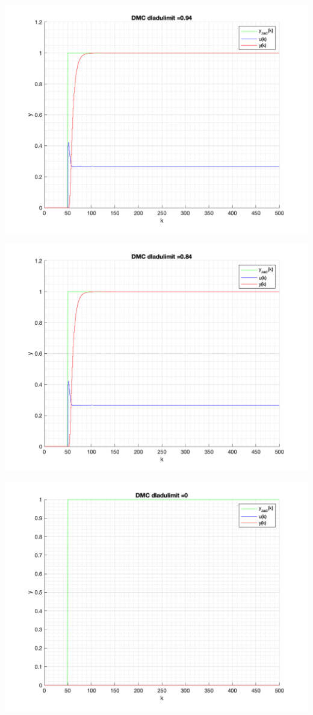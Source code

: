 \documentclass[a4paper, 11pt]{article}
\begin{document}
\begin{enumerate}
 \includegraphics[width=\linewidth]{./ModelsP6_dulimit/P4_DMC_dulimit_0_94_png.png} 
 
 \includegraphics[width=\linewidth]{./ModelsP6_dulimit/P4_DMC_dulimit_0_84_png.png} 
 
 \includegraphics[width=\linewidth]{./ModelsP6_dulimit/P4_DMC_dulimit_0_png.png} 
 

\end{enumerate}
\end{document}
